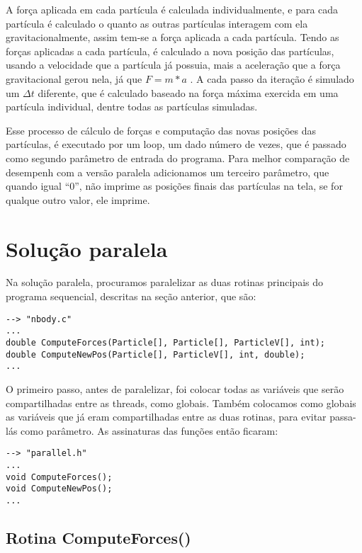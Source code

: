 \documentclass[a4paper, 12pt]{article}
\begin{document}
A força aplicada em cada partícula é calculada individualmente, e para cada
partícula é calculado o quanto as outras partículas interagem com ela
gravitacionalmente, assim tem-se a força aplicada a cada partícula. Tendo as
forças aplicadas a cada partícula, é calculado a nova posição das partículas,
usando a velocidade que a partícula já possuia, mais a aceleração que a força
gravitacional gerou nela, já que $F = m*a$ . A cada passo da iteração é simulado
um $\Delta t$ diferente, que é calculado baseado na força máxima exercida em uma
partícula individual, dentre todas as partículas simuladas.

Esse processo de cálculo de forças e computação das novas posições das
partículas, é executado por um loop, um dado número de vezes, que é passado como
segundo parâmetro de entrada do programa. Para melhor comparação de desempenh
com a versão paralela adicionamos um terceiro parâmetro, que quando igual 
``0'', não imprime as posições finais das partículas na tela, se for qualque
outro valor, ele imprime.


\section{Solução paralela}

Na solução paralela, procuramos paralelizar as duas rotinas principais do
programa sequencial, descritas na seção anterior, que são:
\begin{verbatim}
--> "nbody.c"
...
double ComputeForces(Particle[], Particle[], ParticleV[], int);
double ComputeNewPos(Particle[], ParticleV[], int, double);
...
\end{verbatim}

O primeiro passo, antes de paralelizar, foi colocar todas as variáveis que serão
compartilhadas entre as threads, como globais. Também colocamos como globais as
variáveis que já eram compartilhadas entre as duas rotinas, para evitar
passa-lás como parâmetro. As assinaturas das funções então ficaram:
\begin{verbatim}
--> "parallel.h"
...
void ComputeForces();
void ComputeNewPos();
...
\end{verbatim}


\subsection{Rotina ComputeForces()}
\end{document}
